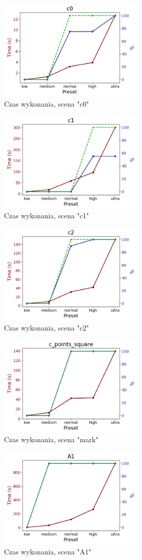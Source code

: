 \begin{figure}[h]
   \centering
   \includegraphics[width=7cm]{measure/c0.png}
   \caption{Czas wykonania, scena "c0"}
   \label {fig:measure_c0}
\end{figure}
\begin{figure}[h]
   \centering
   \includegraphics[width=7cm]{measure/c1.png}
   \caption{Czas wykonania, scena "c1"}
   \label {fig:measure_c1}
\end{figure}
\begin{figure}[h]
   \centering
   \includegraphics[width=7cm]{measure/c2.png}
   \caption{Czas wykonania, scena "c2"}
   \label {fig:measure_c2}
\end{figure}
\begin{figure}[h]
   \centering
   \includegraphics[width=7cm]{measure/mark.png}
   \caption{Czas wykonania, scena "mark"}
   \label {fig:measure_mark}
\end{figure}
\begin{figure}[h]
   \centering
   \includegraphics[width=7cm]{measure/A1.png}
   \caption{Czas wykonania, scena "A1"}
   \label {fig:measure_A1}
\end{figure}

